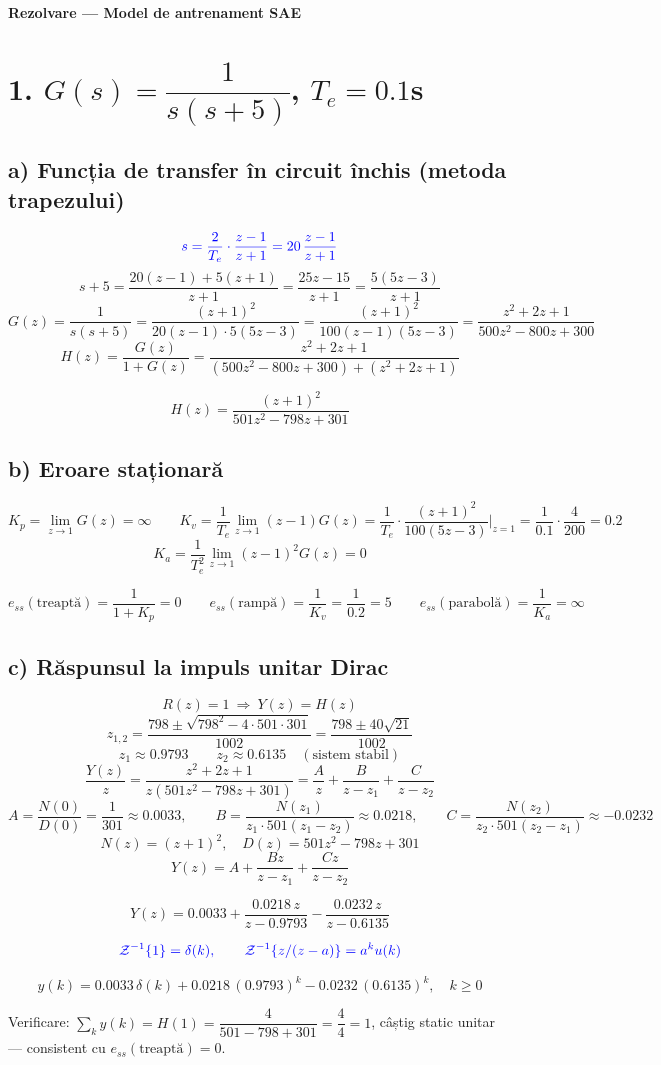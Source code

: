 \documentclass[10pt,a4paper]{article}
\begin{document}
\begin{center}
{\large\bfseries Rezolvare --- Model de antrenament SAE}
\end{center}
\vspace{-0.2cm}

\section*{1. $G(s)=\dfrac1{s(s+5)}$, $T_e=0.1$s}

\subsection*{a) Funcția de transfer în circuit închis (metoda trapezului)}
$$\color{blue}s=\frac{2}{T_e}\cdot\frac{z-1}{z+1}=20\,\frac{z-1}{z+1}$$
$$s+5=\frac{20(z-1)+5(z+1)}{z+1}=\frac{25z-15}{z+1}=\frac{5(5z-3)}{z+1}$$
$$G(z)=\frac1{s(s+5)}=\frac{(z+1)^2}{20(z-1)\cdot5(5z-3)}=\frac{(z+1)^2}{100(z-1)(5z-3)}=\frac{z^2+2z+1}{500z^2-800z+300}$$
$$H(z)=\frac{G(z)}{1+G(z)}=\frac{z^2+2z+1}{(500z^2-800z+300)+(z^2+2z+1)}$$
\begin{res}
$$H(z)=\frac{(z+1)^2}{501z^2-798z+301}$$
\end{res}

\subsection*{b) Eroare staționară}
$$K_p=\lim_{z\to1}G(z)=\infty\qquad
K_v=\frac1{T_e}\lim_{z\to1}(z-1)G(z)=\frac1{T_e}\cdot\frac{(z+1)^2}{100(5z-3)}\bigg|_{z=1}=\frac1{0.1}\cdot\frac4{200}=0.2$$
$$K_a=\frac1{T_e^2}\lim_{z\to1}(z-1)^2G(z)=0$$
\begin{res}
$$e_{ss}(\text{treaptă})=\frac1{1+K_p}=0\qquad
e_{ss}(\text{rampă})=\frac1{K_v}=\frac1{0.2}=5\qquad
e_{ss}(\text{parabolă})=\frac1{K_a}=\infty$$
\end{res}

\subsection*{c) Răspunsul la impuls unitar Dirac}
$$R(z)=1\ \Rightarrow\ Y(z)=H(z)$$
$$z_{1,2}=\dfrac{798\pm\sqrt{798^2-4\cdot501\cdot301}}{1002}=\dfrac{798\pm40\sqrt{21}}{1002}$$
$$z_1\approx0.9793\qquad z_2\approx0.6135\quad(\text{sistem stabil})$$
$$\frac{Y(z)}{z}=\frac{z^2+2z+1}{z(501z^2-798z+301)}=\frac{A}{z}+\frac{B}{z-z_1}+\frac{C}{z-z_2}$$
$$A=\frac{N(0)}{D(0)}=\frac1{301}\approx0.0033,\qquad
B=\frac{N(z_1)}{z_1\cdot501(z_1-z_2)}\approx0.0218,\qquad
C=\frac{N(z_2)}{z_2\cdot501(z_2-z_1)}\approx-0.0232$$
$$N(z)=(z+1)^2,\quad D(z)=501z^2-798z+301$$
$$Y(z)=A+\frac{Bz}{z-z_1}+\frac{Cz}{z-z_2}$$
\begin{res}
$$Y(z)=0.0033+\frac{0.0218\,z}{z-0.9793}-\frac{0.0232\,z}{z-0.6135}$$
\end{res}
$$\textcolor{blue}{\mathcal Z^{-1}\{1\}=\delta(k),\qquad \mathcal Z^{-1}\{z/(z-a)\}=a^k u(k)}$$
\begin{res}
$$y(k)=0.0033\,\delta(k)+0.0218\,(0.9793)^k-0.0232\,(0.6135)^k,\quad k\ge0$$
\end{res}
Verificare: $\sum_k y(k)=H(1)=\dfrac{4}{501-798+301}=\dfrac44=1$, câștig static unitar — consistent cu $e_{ss}(\text{treaptă})=0$.
\end{document}
